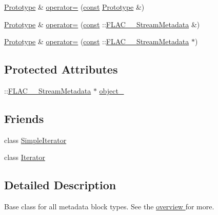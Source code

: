 \begin{DoxyCompactItemize}
\item 
\hyperlink{class_f_l_a_c_1_1_metadata_1_1_prototype}{Prototype} \& \hyperlink{class_f_l_a_c_1_1_metadata_1_1_prototype_aa6e6fbd804baaba187f9e8859a9b05de}{operator=} (\hyperlink{getopt1_8c_a2c212835823e3c54a8ab6d95c652660e}{const} \hyperlink{class_f_l_a_c_1_1_metadata_1_1_prototype}{Prototype} \&)
\item 
\hyperlink{class_f_l_a_c_1_1_metadata_1_1_prototype}{Prototype} \& \hyperlink{class_f_l_a_c_1_1_metadata_1_1_prototype_a442393688a095e0a61fb7615c622fce8}{operator=} (\hyperlink{getopt1_8c_a2c212835823e3c54a8ab6d95c652660e}{const} \+::\hyperlink{struct_f_l_a_c_____stream_metadata}{F\+L\+A\+C\+\_\+\+\_\+\+Stream\+Metadata} \&)
\item 
\hyperlink{class_f_l_a_c_1_1_metadata_1_1_prototype}{Prototype} \& \hyperlink{class_f_l_a_c_1_1_metadata_1_1_prototype_a7488287a46801655defa799f6778600d}{operator=} (\hyperlink{getopt1_8c_a2c212835823e3c54a8ab6d95c652660e}{const} \+::\hyperlink{struct_f_l_a_c_____stream_metadata}{F\+L\+A\+C\+\_\+\+\_\+\+Stream\+Metadata} $\ast$)
\end{DoxyCompactItemize}

\subsection*{Protected Attributes}
\begin{DoxyCompactItemize}
\item 
\+::\hyperlink{struct_f_l_a_c_____stream_metadata}{F\+L\+A\+C\+\_\+\+\_\+\+Stream\+Metadata} $\ast$ \hyperlink{class_f_l_a_c_1_1_metadata_1_1_prototype_ae3bddea1798a712c7d43d393807a9961}{object\+\_\+}
\end{DoxyCompactItemize}
\subsection*{Friends}
\begin{DoxyCompactItemize}
\item 
class \hyperlink{class_f_l_a_c_1_1_metadata_1_1_prototype_a1a91972da3d48474ff55199140e9bc0b}{Simple\+Iterator}
\item 
class \hyperlink{class_f_l_a_c_1_1_metadata_1_1_prototype_a9830fc407400559db7e7783cc10a9394}{Iterator}
\end{DoxyCompactItemize}


\subsection{Detailed Description}
Base class for all metadata block types. See the \hyperlink{group__flacpp__metadata__object}{overview } for more. 

